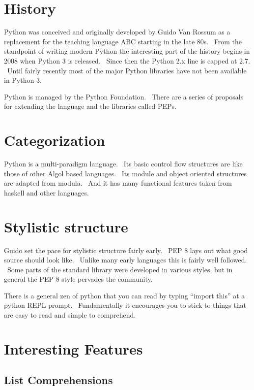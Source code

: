 \documentclass[]{article}
\begin{document}
\section{History}

Python was conceived and originally developed by Guido Van Rossum as a
replacement for the teaching language ABC starting in the late 80s.
~From the standpoint of writing modern Python the interesting part of
the history begins in 2008 when Python 3 is released. ~Since then the
Python 2.x line is capped at 2.7. ~Until fairly recently most of the
major Python libraries have not been available in Python 3.

Python is managed by the Python Foundation. ~There are a series of
proposals for extending the language and the libraries called PEPs.

\section{Categorization}

Python is a multi-paradigm language. ~Its basic control flow structures
are like those of other Algol based languages. ~Its module and object
oriented structures are adapted from modula. ~And it has many functional
features taken from haskell and other languages.

\section{Stylistic structure}

Guido set the pace for stylistic structure fairly early. ~PEP 8 lays out
what good source should look like. ~Unlike many early languages this is
fairly well followed. ~Some parts of the standard library were developed
in various styles, but in general the PEP 8 style pervades the
community.

There is a general zen of python that you can read by typing ``import
this'' at a python REPL prompt. ~Fundamentally it encourages you to
stick to things that are easy to read and simple to comprehend.

\section{Interesting Features}

\subsection{List Comprehensions}
\end{document}
